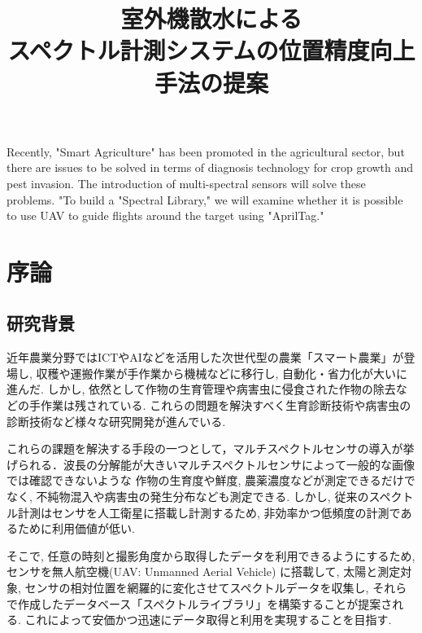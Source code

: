 \documentclass[a4j,fleqn,dvipdfmx,uplatex]{jsarticle}
\begin{document}
%
\title{室外機散水による\\スペクトル計測システムの位置精度向上手法の提案} %
\etitle{} %
\abst
{Recently, "Smart Agriculture" has been promoted in the agricultural sector, but there are issues to be solved in terms of diagnosis technology 
for crop growth and pest invasion. The introduction of multi-spectral sensors will solve these problems. 
"To build a "Spectral Library," we will examine whether it is possible to use UAV to guide flights around the target using "AprilTag."}

\maketitle
\section{序論}\label{sec1}
\subsection{研究背景}\label{background}
近年農業分野ではICTやAIなどを活用した次世代型の農業「スマート農業\cite{SmartAgri}」が登場し, 収穫や運搬作業が手作業から機械などに移行し, 自動化・省力化が大いに進んだ. 
しかし, 依然として作物の生育管理や病害虫に侵食された作物の除去などの手作業は残されている. 
これらの問題を解決すべく生育診断技術や病害虫の診断技術など様々な研究開発が進んでいる\cite{SMART_AGRI}. 

これらの課題を解決する手段の一つとして，マルチスペクトルセンサの導入が挙げられる．波長の分解能が大きいマルチスペクトルセンサによって一般的な画像では確認できないような
作物の生育度や鮮度, 農薬濃度などが測定できるだけでなく, 不純物混入や病害虫の発生分布なども測定できる\cite{HS}. 
しかし, 従来のスペクトル計測はセンサを人工衛星に搭載し計測するため, 非効率かつ低頻度の計測であるために利用価値が低い. 

そこで, 任意の時刻と撮影角度から取得したデータを利用できるようにするため, センサを無人航空機(UAV: Unmanned Aerial Vehicle) に搭載して, 
太陽と測定対象, センサの相対位置を網羅的に変化させてスペクトルデータを収集し, それらで作成したデータベース「スペクトルライブラリ」を構築することが提案される. 
これによって安価かつ迅速にデータ取得と利用を実現することを目指す.
\end{document}
